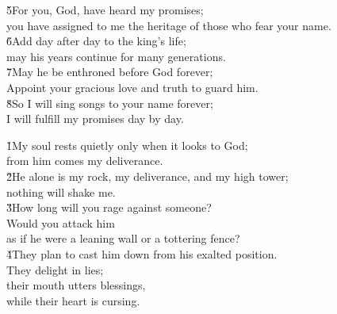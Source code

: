 \begin{poetry}
\poeml \v{5}For you, God, have heard my promises; \\
\poemll    you have assigned to me the heritage of those who fear your name. \\
\poeml \v{6}Add day after day to the king's life; \\
\poemll    may his years continue for many generations. \\
\poeml \v{7}May he be enthroned before God forever; \\
\poemll    Appoint your gracious love and truth to guard him. \\
\poeml \v{8}So I will sing songs to your name forever; \\
\poemll    I will fulfill my promises day by day.
\end{poetry}

\begin{poetry}
\poeml \v{1}My soul rests quietly only when it looks to God; \\
\poemll    from him comes my deliverance. \\
\poeml \v{2}He alone is my rock, my deliverance, and my high tower; \\
\poemll    nothing will shake me. \\
\poeml \v{3}How long will you rage against someone? \\
\poemll    Would you attack him \\
\poemlll       as if he were a leaning wall or a tottering fence? \\
\poeml \v{4}They plan to cast him down from his exalted position. \\
\poemll    They delight in lies; \\
\poeml their mouth utters blessings, \\
\poemll    while their heart is cursing.
\end{poetry}

